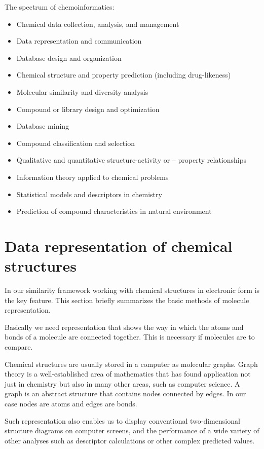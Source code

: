 \documentclass[thesis=M,english]{FITthesis}[2012/10/20]
\begin{document}
The spectrum of chemoinformatics:
\begin{itemize}
\item Chemical data collection, analysis, and management
\item Data representation and communication
\item Database design and organization
\item Chemical structure and property prediction (including drug-likeness)
\item Molecular similarity and diversity analysis
\item Compound or library design and optimization
\item Database mining
\item Compound classification and selection
\item Qualitative and quantitative structure-activity or – property relationships
\item Information theory applied to chemical problems
\item Statistical models and descriptors in chemistry
\item Prediction of compound characteristics in natural environment 
\end{itemize}

\section{Data representation of chemical structures}
\label{chemicalDataRef}
In our similarity framework working with chemical structures in electronic form is the key feature. This section briefly summarizes the basic methods of molecule representation.

Basically we need representation that shows the way in which the atoms and bonds of a molecule are connected together. This is necessary if molecules are to compare. 

Chemical structures are usually stored in a computer as molecular graphs. Graph theory is a well-established area of mathematics that has found application not just in chemistry but also in many other areas, such as computer science. A graph is an abstract structure that contains nodes connected by edges. In our case nodes are atoms and edges are bonds.

Such representation also enables us to display conventional two-dimensional structure diagrams on computer screens, and the performance of a wide variety of other analyses such as descriptor calculations or other complex predicted values.
\end{document}
